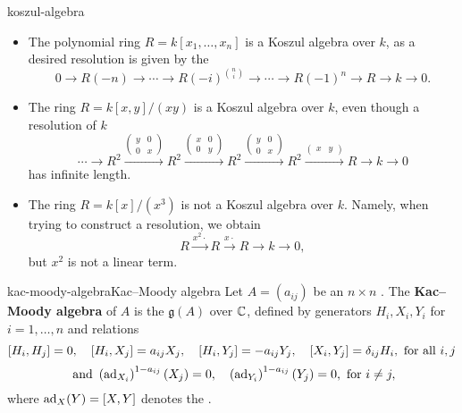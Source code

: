 \begin{example}{koszul-algebra}
    \begin{itemize}
        \item The polynomial ring $R = k[x_1, \ldots, x_n]$ is a Koszul algebra over $k$, as a desired resolution is given by the 
        \[ 0 \to R(-n) \to \cdots \to R(-i)^{\binom{n}{i}} \to \cdots \to R(-1)^n \to R \to k \to 0 . \]
        \item The ring $R = k[x, y]/(xy)$ is a Koszul algebra over $k$, even though a resolution of $k$
        \[ \cdots \to R^2 \xrightarrow{\begin{pmatrix} y & 0 \\ 0 & x \end{pmatrix}} R^2 \xrightarrow{\begin{pmatrix} x & 0 \\ 0 & y \end{pmatrix}} R^2 \xrightarrow{\begin{pmatrix} y & 0 \\ 0 & x \end{pmatrix}} R^2 \xrightarrow{\begin{pmatrix} x & y \end{pmatrix}} R \to k \to 0 \]
        has infinite length.
        \item The ring $R = k[x] / (x^3)$ is not a Koszul algebra over $k$. Namely, when trying to construct a resolution, we obtain
        \[ R \xrightarrow{x^2 \cdot} R \xrightarrow{x \cdot} R \to k \to 0 , \]
        but $x^2$ is not a linear term.
    \end{itemize}
\end{example}

\begin{topic}{kac-moody-algebra}{Kac--Moody algebra}
    Let $A = (a_{ij})$ be an $n \times n$ . The \textbf{Kac--Moody algebra} of $A$ is the  $\mathfrak{g}(A)$ over $\mathbb{C}$, defined by generators $H_i, X_i, Y_i$ for $i = 1, \ldots, n$ and relations
    \[ [H_i, H_j] = 0, \quad [H_i, X_j] = a_{ij} X_j, \quad [H_i, Y_j] = -a_{ij} Y_j, \quad [X_i, Y_j] = \delta_{ij} H_i , \textup{ for all } i, j \]
    \[ \textup{ and } \left(\textup{ad}_{X_i}\right)^{1 - a_{ij}}(X_j) = 0, \quad \left(\textup{ad}_{Y_i}\right)^{1 - a_{ij}}(Y_j) = 0, \textup{ for } i \ne j , \]
    where $\textup{ad}_X(Y) = [X, Y]$ denotes the .
\end{topic}

